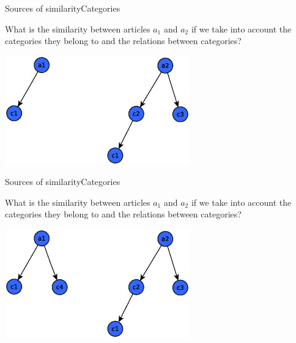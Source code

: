 \documentclass[xcolor=dvipsnames]{beamer}
\begin{document}
\begin{frame}{Sources of similarity}{Categories}

What is the similarity between articles $a_1$ and $a_2$  if we take into account the categories they belong to and the relations between categories?

\begin{center}

\includegraphics[width=0.6\textwidth, height=0.4\paperheight]{media/sim1.1.eps}

\end{center}

\end{frame}


\begin{frame}{Sources of similarity}{Categories}


What is the similarity between articles $a_1$ and $a_2$  if we take into account the categories they belong to and the relations between categories?


\begin{center}

\includegraphics[width=0.6\textwidth, height=0.4\paperheight]{media/sim0.5.eps}

\end{center}

\end{frame}
\end{document}
